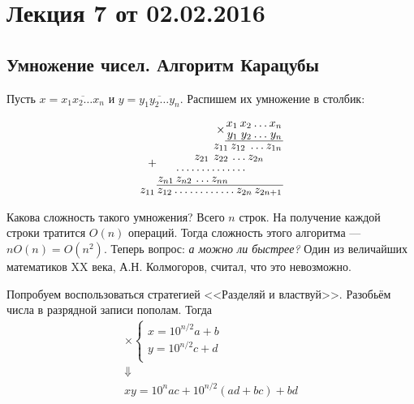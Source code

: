 



\section{Лекция 7 от 02.02.2016}

\subsection{Умножение чисел. Алгоритм Карацубы}

Пусть \(x = \overline{x_1 x_2 \ldots x_n}\) и \(y = \overline{y_1 y_2 \ldots y_n}\). Распишем их умножение в столбик:
\begin{center}
	\[
	\renewcommand{\arraystretch}{0.8}
	\arraycolsep=1pt
	\begin{array}{r}
	\times\begin{array}{rrrr}
	x_1 & x_2 & \ldots & x_n \\
	y_1 & y_2 & \ldots & y_n \\
	\hline
	\end{array}
	\\
	+\begin{array}{rrrrrrr}
	& & & z_{11} & z_{12} & \ldots & z_{1n} \\
	& & z_{21} & z_{22} & \ldots & z_{2n} & \\
	& \hdotsfor{4} & & \\
	z_{n1} & z_{n2} & \ldots & z_{nn} & & & \\
	\hline
	\end{array}
	\\
	\begin{array}{rrrrrrrr}
	z_{11} & z_{12} & \dots & \dots & \dots & \dots & z_{2n} & z_{2n+1} \\
	\end{array}
	\end{array}\]
\end{center}


Какова сложность такого умножения? Всего \(n\) строк. На получение каждой строки тратится \(O(n)\) операций. Тогда сложность этого алгоритма --- \(nO(n) = O(n^2)\). Теперь вопрос: \emph{а можно ли быстрее?} Один из величайших математиков XX века, А.Н. Колмогоров, считал, что это невозможно.

Попробуем воспользоваться стратегией <<Разделяй и властвуй>>. Разобьём числа в разрядной записи пополам. Тогда
\[\begin{array}{c}
\times \begin{cases}
x = 10^{n/2}a + b\\
y = 10^{n/2}c + d\\
\end{cases} \\
\Downarrow\\
xy = 10^{n}ac + 10^{n/2}(ad+bc)+bd
\end{array}\]


